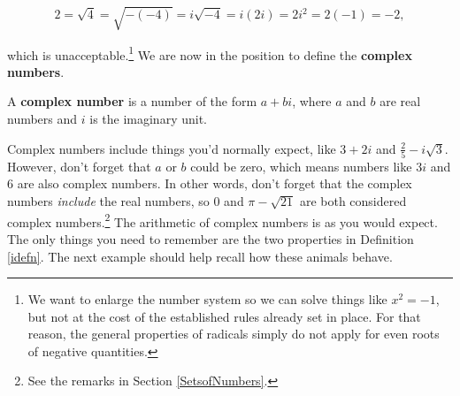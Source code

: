 \[ 2 = \sqrt{4} = \sqrt{-(-4)} = i \sqrt{-4} = i (2i) = 2i^2 = 2(-1) = -2,\]

which is unacceptable.\footnote{We want to enlarge the number system so we can solve things like $x^2=-1$, but not at the cost of the established rules already set in place.  For that reason, the general properties of radicals simply do not apply for even roots of negative quantities.}  We are now in the position to define the  \textbf{complex numbers}.

\medskip

\colorbox{ResultColor}{\bbm
\begin{defn} \label{complexdefn} A \textbf{complex number} is a number of the form $a+bi$, where $a$ and $b$ are real numbers and $i$ is the imaginary unit.
\end{defn}
\ebm}

\medskip

Complex numbers include things you'd normally expect, like $3+2i$ and $\frac{2}{5} - i\sqrt{3}$.  However, don't forget that $a$ or $b$ could be zero, which means numbers like $3i$ and $6$ are also complex numbers.  In other words, don't forget that the complex numbers \textit{include} the real numbers, so $0$ and $\pi - \sqrt{21}$ are both considered complex numbers.\footnote{See the remarks in Section \ref{SetsofNumbers}.}  The arithmetic of complex numbers is as you would expect.  The only things you need to remember are the two properties in Definition \ref{idefn}.  The next example should help recall how these animals behave.

\pagebreak

